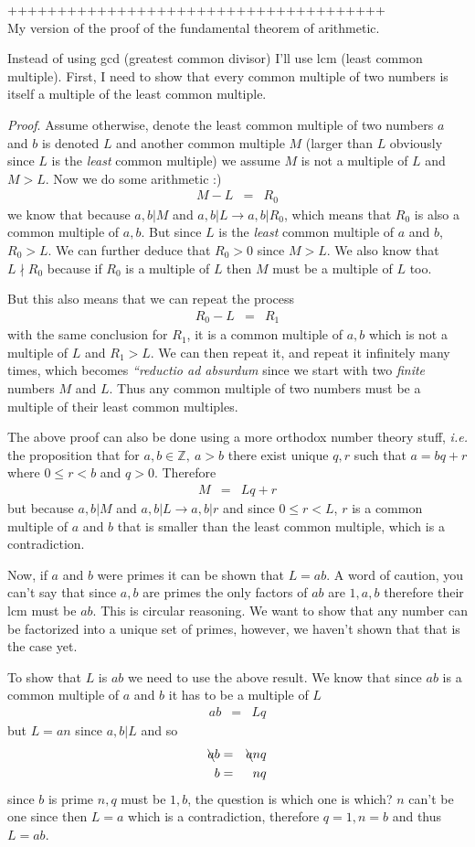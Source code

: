 \documentclass[aps,preprint,preprintnumbers,nofootinbib,showpacs,prd]{revtex4-1}
\newcommand{\ie}{{\it i.e.} }
\newcommand{\nbea}{\begin{eqnarray*}}
\newcommand{\neea}{\end{eqnarray*}}
\begin{document}
++++++++++++++++++++++++++++++++++++++ \\

My version of the proof of the fundamental theorem of arithmetic.

Instead of using gcd (greatest common divisor) I'll use lcm (least common multiple). First, I need to show that every common multiple of two numbers is itself a multiple of the least common multiple.

{\it Proof}. Assume otherwise, denote the least common multiple of two numbers $a$ and $b$ is denoted $L$ and another common multiple $M$ (larger than $L$ obviously since $L$ is the {\it least} common multiple) we assume $M$ is not a multiple of $L$ and $M > L$. Now we do some arithmetic :)
%
\nbea
M - L & = & R_0
\neea
%
we know that because $a,b|M$ and $a,b|L \longrightarrow a,b|R_0$, which means that $R_0$ is also a common multiple of $a,b$. But since $L$ is the {\it least} common multiple of $a$ and $b$, $R_0 > L$. We can further deduce that $R_0 > 0$ since $M > L$. We also know that $L \nmid R_0$ because if $R_0$ is a multiple of $L$ then $M$ must be a multiple of $L$ too.

But this also means that we can repeat the process
%
\nbea
R_0 - L & = & R_1
\neea
%
with the same conclusion for $R_1$, it is a common multiple of $a,b$ which is not a multiple of $L$ and $R_1 > L$. We can then repeat it, and repeat it infinitely many times, which becomes {\it ``reductio ad absurdum} since we start with two {\it finite} numbers $M$ and $L$. Thus any common multiple of two numbers must be a multiple of their least common multiples.

The above proof can also be done using a more orthodox number theory stuff, \ie the proposition that for $a,b \in \mathbb{Z}, ~a>b$ there exist unique $q, r$ such that $a = bq + r$ where $0 \le r < b$ and $q > 0$. Therefore
%
\nbea
M & = & Lq + r
\neea
%
but because $a,b|M$ and $a,b|L \longrightarrow a,b|r$ and since $0 \le r < L$, $r$ is a common multiple of $a$ and $b$ that is smaller than the least common multiple, which is a contradiction.

Now, if $a$ and $b$ were primes it can be shown that $L=ab$. A word of caution, you can't say that since $a,b$ are primes the only factors of $ab$ are $1,a,b$ therefore their lcm must be $ab$. This is circular reasoning. We want to show that any number can be factorized into a unique set of primes, however, we haven't shown that that is the case yet.

To show that $L$ is $ab$ we need to use the above result. We know that since $ab$ is a common multiple of $a$ and $b$ it has to be a multiple of $L$
%
\nbea
ab & = & Lq
\neea
%
but $L = an$ since $a,b|L$ and so
%
\nbea
\bcancel{a}b & = & \bcancel{a}nq \\
b & = & nq
\neea
%
since $b$ is prime $n,q$ must be $1,b$, the question is which one is which? $n$ can't be one since then $L=a$ which is a contradiction, therefore $q=1, n=b$ and thus $L=ab$.
\end{document}
